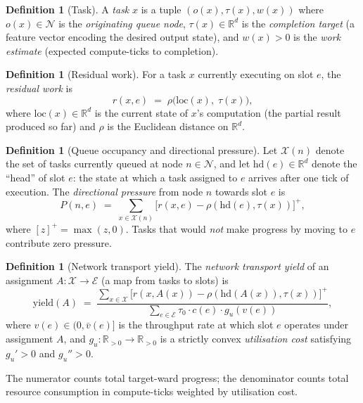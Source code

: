 \documentclass[11pt,twocolumn,a4paper]{article}
\theoremstyle{plain}
\theoremstyle{definition}
\newtheorem{definition}[theorem]{Definition}
\theoremstyle{remark}
\newcommand{\N}{\mathcal{N}}
\newcommand{\E}{\mathcal{E}}
\newcommand{\X}{\mathcal{X}}
\newcommand{\R}{\mathbb{R}}
\newcommand{\tick}{\tau_0}
\newcommand{\yield}{\mathrm{yield}}
\newcommand{\pres}{P}
\begin{document}
\begin{definition}[Task]
\label{def:task}
A \emph{task} $x$ is a tuple $(o(x), \tau(x), w(x))$ where $o(x) \in \N$ is the \emph{originating queue node}, $\tau(x) \in \R^d$ is the \emph{completion target} (a feature vector encoding the desired output state), and $w(x) > 0$ is the \emph{work estimate} (expected compute-ticks to completion).
\end{definition}

\begin{definition}[Residual work]
\label{def:residual}
For a task $x$ currently executing on slot $e$, the \emph{residual work} is
\[
  r(x, e) \;=\; \rho\bigl(\mathrm{loc}(x),\; \tau(x)\bigr),
\]
where $\mathrm{loc}(x) \in \R^d$ is the current state of $x$'s computation (the partial result produced so far) and $\rho$ is the Euclidean distance on $\R^d$.
\end{definition}

\begin{definition}[Queue occupancy and directional pressure]
\label{def:pressure}
Let $\X(n)$ denote the set of tasks currently queued at node $n \in \N$, and let $\mathrm{hd}(e) \in \R^d$ denote the ``head'' of slot $e$: the state at which a task assigned to $e$ arrives after one tick of execution. The \emph{directional pressure} from node $n$ towards slot $e$ is
\[
  \pres(n, e) \;=\; \sum_{x \in \X(n)} \bigl[r(x, e) - \rho(\mathrm{hd}(e), \tau(x))\bigr]^{+},
\]
where $[z]^+ = \max(z, 0)$. Tasks that would \emph{not} make progress by moving to $e$ contribute zero pressure.
\end{definition}

\begin{definition}[Network transport yield]
\label{def:yield}
The \emph{network transport yield} of an assignment $A : \X \to \E$ (a map from tasks to slots) is
\[
  \yield(A) \;=\; \frac{\displaystyle\sum_{x \in \X} \bigl[r(x, A(x)) - \rho(\mathrm{hd}(A(x)), \tau(x))\bigr]^{+}}
                        {\displaystyle\sum_{e \in \E} \tick \cdot c(e) \cdot g_u(v(e))},
\]
where $v(e) \in (0, \bar{v}(e)]$ is the throughput rate at which slot $e$ operates under assignment $A$, and $g_u : \R_{>0} \to \R_{>0}$ is a strictly convex \emph{utilisation cost} satisfying $g_u' > 0$ and $g_u'' > 0$.

\noindent
The numerator counts total target-ward progress; the denominator counts total resource consumption in compute-ticks weighted by utilisation cost.
\end{definition}
\end{document}
